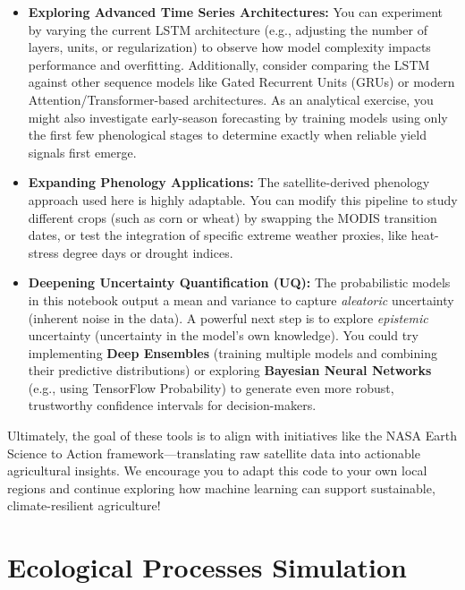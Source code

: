 \documentclass[
  letterpaper,
  DIV=11,
  numbers=noendperiod]{scrreprt}
\providecommand{\tightlist}{%
  \setlength{\itemsep}{0pt}\setlength{\parskip}{0pt}}\usepackage{longtable,booktabs,array}
\begin{document}
\begin{itemize}
\tightlist
\item
  \textbf{Exploring Advanced Time Series Architectures:} You can
  experiment by varying the current LSTM architecture (e.g., adjusting
  the number of layers, units, or regularization) to observe how model
  complexity impacts performance and overfitting. Additionally, consider
  comparing the LSTM against other sequence models like Gated Recurrent
  Units (GRUs) or modern Attention/Transformer-based architectures. As
  an analytical exercise, you might also investigate early-season
  forecasting by training models using only the first few phenological
  stages to determine exactly when reliable yield signals first emerge.
\item
  \textbf{Expanding Phenology Applications:} The satellite-derived
  phenology approach used here is highly adaptable. You can modify this
  pipeline to study different crops (such as corn or wheat) by swapping
  the MODIS transition dates, or test the integration of specific
  extreme weather proxies, like heat-stress degree days or drought
  indices.
\item
  \textbf{Deepening Uncertainty Quantification (UQ):} The probabilistic
  models in this notebook output a mean and variance to capture
  \emph{aleatoric} uncertainty (inherent noise in the data). A powerful
  next step is to explore \emph{epistemic} uncertainty (uncertainty in
  the model's own knowledge). You could try implementing \textbf{Deep
  Ensembles} (training multiple models and combining their predictive
  distributions) or exploring \textbf{Bayesian Neural Networks} (e.g.,
  using TensorFlow Probability) to generate even more robust,
  trustworthy confidence intervals for decision-makers.
\end{itemize}

Ultimately, the goal of these tools is to align with initiatives like
the NASA Earth Science to Action framework---translating raw satellite
data into actionable agricultural insights. We encourage you to adapt
this code to your own local regions and continue exploring how machine
learning can support sustainable, climate-resilient agriculture!


\chapter{Ecological Processes
Simulation}\label{ecological-processes-simulation}
\end{document}
